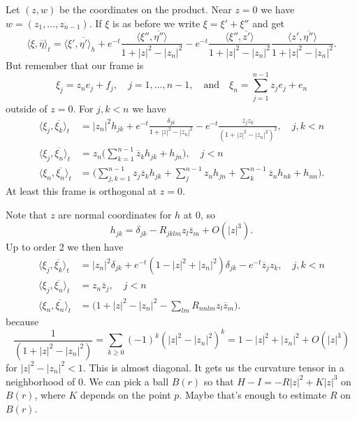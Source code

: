 \documentclass[10pt,a4paper]{amsart}
\def\<{\langle}
\def\>{\rangle}
\def\qandq{\quad\text{and}\quad}
\def\ov#1{\overline{#1}}
\begin{document}
Let $(z,w)$ be the coordinates on the product.
Near $z = 0$ we have $w = (z_1, \ldots, z_{n-1})$.
If $\xi$ is as before we write $\xi = \xi' + \xi''$ and get
$$
\<\xi, \ov\eta\>_t
= \<\xi', \ov{\eta'} \>_h
+ e^{-t} \frac{\<\xi'', \ov{\eta''} \>}{1 + |z|^2 - |z_n|^2}
- e^{-t} \frac{\<\xi'', \ov{z'} \>}{1 + |z|^2 - |z_n|^2}
\frac{\<z', \ov{\eta''} \>}{1 + |z|^2 - |z_n|^2}.
$$
But remember that our frame is
$$
\xi_j = z_n e_j + f_j,
\quad j=1,\ldots,n-1,
\qandq
\xi_n = \sum_{j=1}^{n-1} z_j e_j + e_n
$$
outside of $z = 0$.
For $j, k < n$ we have
\begin{align*}
\< \xi_j, \ov{\xi_k} \>_t
&= |z_n|^2 h_{jk}
+ e^{-t} \frac{\delta_{jk}}{1 + |z|^2 - |z_n|^2}
- e^{-t} \frac{\ov z_j z_k}{(1 + |z|^2 - |z_n|^2)^2},
\quad
j, k < n
\\
\< \xi_j, \ov{\xi_n} \>_t
&= z_n \biggl(
\sum_{k=1}^{n-1} \ov z_k h_{jk} + h_{jn}
\biggr),
\quad j < n
\\
\< \xi_n, \ov{\xi_n} \>_t
&= \biggl(
\sum_{j,k=1}^{n-1} z_j \ov z_k h_{jk}
+ \sum_{j}^{n-1} z_n h_{jn}
+ \sum_{k}^{n-1} \ov z_n h_{nk}
+ h_{nn}
\biggr).
\end{align*}
At least this frame is orthogonal at $z = 0$.

Note that $z$ are normal coordinates for $h$ at $0$, so
$$
h_{jk}
= \delta_{jk} - R_{jklm} z_l \ov z_m + O(|z|^3).
$$
Up to order 2 we then have
\begin{align*}
\< \xi_j, \ov{\xi_k} \>_t
&= |z_n|^2 \delta_{jk}
+ e^{-t}(1 - |z|^2 + |z_n|^2) \delta_{jk}
- e^{-t}\ov z_j z_k ,
\quad
j, k < n
\\
\< \xi_j, \ov{\xi_n} \>_t
&= z_n \ov z_j,
\quad j < n
\\
\< \xi_n, \ov{\xi_n} \>_t
&= \bigl(
1 + |z|^2 - |z_n|^2 - \sum_{lm} R_{nnlm} z_l \ov z_m
\bigr).
\end{align*}
because
$$
\frac{1}{(1+|z|^2-|z_n|^2)}
= \sum_{k \geq 0} (-1)^k (|z|^2 - |z_n|^2)^k
= 1 - |z|^2 + |z_n|^2 + O(|z|^3)
$$
for $|z|^2 - |z_n|^2 < 1$.
This is almost diagonal.
It gets us the curvature tensor in a neighborhood of $0$.
We can pick a ball $B(r)$ so that $H - I = -R |z|^2 + K|z|^3$ on $B(r)$,
where $K$ depends on the point $p$. Maybe that's enough to estimate $R$ on
$B(r)$.
\end{document}
